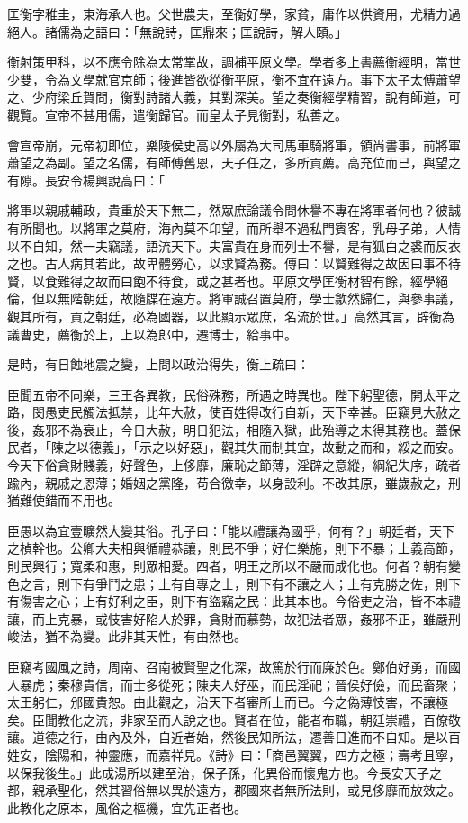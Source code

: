 
\begin{pinyinscope}
匡衡字稚圭，東海承人也。父世農夫，至衡好學，家貧，庸作以供資用，尤精力過絕人。諸儒為之語曰：「無說詩，匡鼎來；匡說詩，解人頤。」

衡射策甲科，以不應令除為太常掌故，調補平原文學。學者多上書薦衡經明，當世少雙，令為文學就官京師；後進皆欲從衡平原，衡不宜在遠方。事下太子太傅蕭望之、少府梁丘賀問，衡對詩諸大義，其對深美。望之奏衡經學精習，說有師道，可觀覽。宣帝不甚用儒，遣衡歸官。而皇太子見衡對，私善之。

會宣帝崩，元帝初即位，樂陵侯史高以外屬為大司馬車騎將軍，領尚書事，前將軍蕭望之為副。望之名儒，有師傅舊恩，天子任之，多所貢薦。高充位而已，與望之有隙。長安令楊興說高曰：「

將軍以親戚輔政，貴重於天下無二，然眾庶論議令問休譽不專在將軍者何也？彼誠有所聞也。以將軍之莫府，海內莫不卬望，而所舉不過私門賓客，乳母子弟，人情以不自知，然一夫竊議，語流天下。夫富貴在身而列士不譽，是有狐白之裘而反衣之也。古人病其若此，故卑體勞心，以求賢為務。傳曰：以賢難得之故因曰事不待賢，以食難得之故而曰飽不待食，或之甚者也。平原文學匡衡材智有餘，經學絕倫，但以無階朝廷，故隨牒在遠方。將軍誠召置莫府，學士歙然歸仁，與參事議，觀其所有，貢之朝廷，必為國器，以此顯示眾庶，名流於世。」高然其言，辟衡為議曹史，薦衡於上，上以為郎中，遷博士，給事中。

是時，有日蝕地震之變，上問以政治得失，衡上疏曰：

臣聞五帝不同樂，三王各異教，民俗殊務，所遇之時異也。陛下躬聖德，開太平之路，閔愚吏民觸法抵禁，比年大赦，使百姓得改行自新，天下幸甚。臣竊見大赦之後，姦邪不為衰止，今日大赦，明日犯法，相隨入獄，此殆導之未得其務也。蓋保民者，「陳之以德義」，「示之以好惡」，觀其失而制其宜，故動之而和，綏之而安。今天下俗貪財賤義，好聲色，上侈靡，廉恥之節薄，淫辟之意縱，綱紀失序，疏者踰內，親戚之恩薄；婚姻之黨隆，苟合徼幸，以身設利。不改其原，雖歲赦之，刑猶難使錯而不用也。

臣愚以為宜壹曠然大變其俗。孔子曰：「能以禮讓為國乎，何有？」朝廷者，天下之楨幹也。公卿大夫相與循禮恭讓，則民不爭；好仁樂施，則下不暴；上義高節，則民興行；寬柔和惠，則眾相愛。四者，明王之所以不嚴而成化也。何者？朝有變色之言，則下有爭鬥之患；上有自專之士，則下有不讓之人；上有克勝之佐，則下有傷害之心；上有好利之臣，則下有盜竊之民：此其本也。今俗吏之治，皆不本禮讓，而上克暴，或忮害好陷人於罪，貪財而慕勢，故犯法者眾，姦邪不正，雖嚴刑峻法，猶不為變。此非其天性，有由然也。

臣竊考國風之詩，周南、召南被賢聖之化深，故篤於行而廉於色。鄭伯好勇，而國人暴虎；秦穆貴信，而士多從死；陳夫人好巫，而民淫祀；晉侯好儉，而民畜聚；太王躬仁，邠國貴恕。由此觀之，治天下者審所上而已。今之偽薄忮害，不讓極矣。臣聞教化之流，非家至而人說之也。賢者在位，能者布職，朝廷崇禮，百僚敬讓。道德之行，由內及外，自近者始，然後民知所法，遷善日進而不自知。是以百姓安，陰陽和，神靈應，而嘉祥見。《詩》曰：「商邑翼翼，四方之極；壽考且寧，以保我後生。」此成湯所以建至治，保子孫，化異俗而懷鬼方也。今長安天子之都，親承聖化，然其習俗無以異於遠方，郡國來者無所法則，或見侈靡而放效之。此教化之原本，風俗之樞機，宜先正者也。


\end{pinyinscope}
